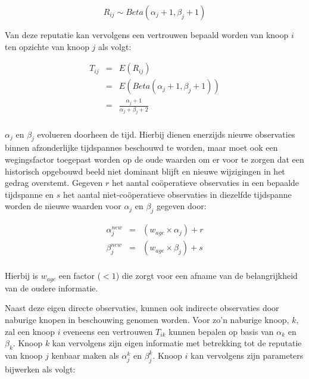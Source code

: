 \begin{equation} \label{eq:reputation-beta}
R_{ij} \sim Beta(\alpha_j+1, \beta_j+1)
\end{equation}

Van deze reputatie kan vervolgens een vertrouwen bepaald worden van knoop $i$
ten opzichte van knoop $j$ als volgt: 

\begin{equation} \label{eq:reputation-trust}
\begin{array}{rcl}
T_{ij} & = & E(R_{ij}) \\
       & = & E(Beta(\alpha_j+1, \beta_j+1)) \\
       & = & \frac{\alpha_j+1}{\alpha_j+\beta_j+2} \\
\end{array}
\end{equation}

$\alpha_j$ en $\beta_j$ evolueren doorheen de tijd. Hierbij dienen enerzijds
nieuwe observaties binnen afzonderlijke tijdspannes beschouwd te worden, maar
moet ook een wegingsfactor toegepast worden op de oude waarden om er voor te
zorgen dat een historisch opgebouwd beeld niet dominant blijft en nieuwe
wijzigingen in het gedrag overstemt. Gegeven $r$ het aantal co\"operatieve
observaties in een bepaalde tijdspanne en $s$ het aantal niet-co\"operatieve
observaties in diezelfde tijdspanne worden de nieuwe waarden voor $\alpha_j$ en
$\beta_j$ gegeven door:

\begin{equation} \label{eq:reputation-update-direct}
\begin{array}{rcl}
\alpha^{new}_j & = & (w_{age} \times \alpha_j) + r \\
\beta^{new}_j  & = & (w_{age} \times \beta_j) + s \\
\end{array}
\end{equation}

Hierbij is $w_{age}$ een factor ($< 1$) die zorgt voor een afname van de
belangrijkheid van de oudere informatie.

Naast deze eigen directe observaties, kunnen ook indirecte observaties door
naburige knopen in beschouwing genomen worden. Voor zo'n naburige knoop, $k$,
zal een knoop $i$ eveneens een vertrouwen $T_{ik}$ kunnen bepalen op basis van
$\alpha_k$ en $\beta_k$. Knoop $k$ kan vervolgens zijn eigen informatie met
betrekking tot de reputatie van knoop $j$ kenbaar maken als $\alpha^k_j$ en
$\beta^k_j$. Knoop $i$ kan vervolgens zijn parameters bijwerken als volgt:

